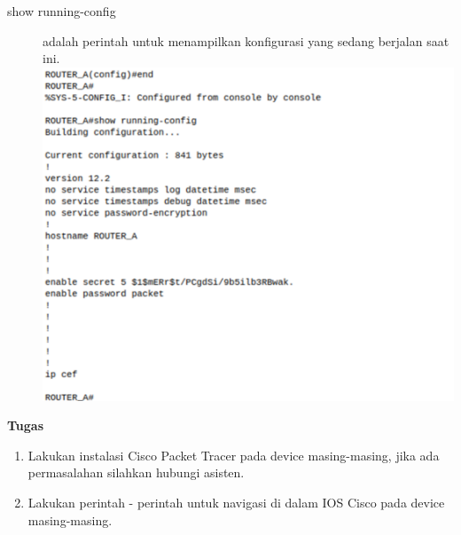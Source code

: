 \documentclass{article}
\begin{document}
\begin{flushleft}
\begin{description}
            \item[show running-config] adalah perintah untuk menampilkan konfigurasi yang sedang berjalan saat ini.
            \includegraphics[scale=0.8]{running-config.png}
        \end{description}

    \end{flushleft}

    \newpage
    \begin{flushleft}
        \textbf{Tugas}
        \newline

        \begin{enumerate}
            \item Lakukan instalasi Cisco Packet Tracer pada device masing-masing, jika ada permasalahan silahkan hubungi asisten.
            \item Lakukan perintah - perintah untuk navigasi di dalam IOS Cisco pada device masing-masing.
        \end{enumerate}
    \end{flushleft}
\end{document}
